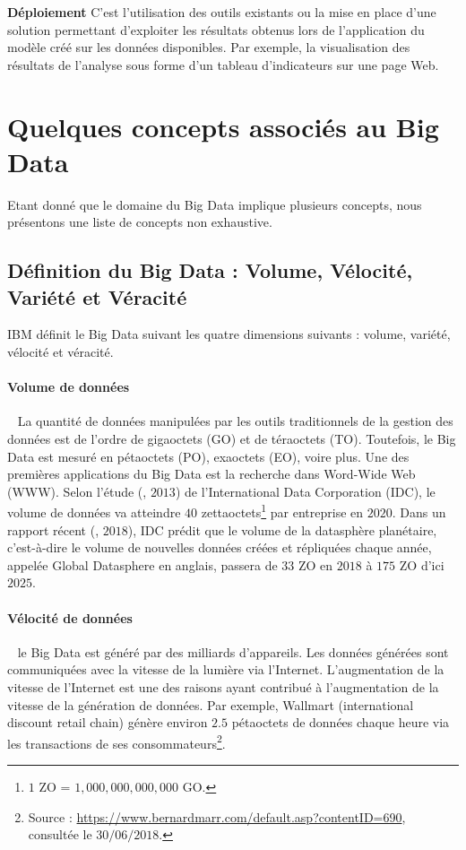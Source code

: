 \textbf{Déploiement}  C'est l'utilisation  des outils existants ou  la mise en place d'une solution permettant d'exploiter les résultats obtenus lors de l'application du modèle créé sur les données disponibles. Par exemple, la  visualisation des résultats de l'analyse  sous forme d'un tableau d'indicateurs sur une page Web. \par
\section{Quelques concepts associés au Big Data}
Etant donné que le domaine du Big Data implique plusieurs concepts, nous présentons une liste de concepts  non exhaustive. 
\subsection{Définition du Big Data : Volume, Vélocité, Variété et Véracité}
		IBM définit le Big Data suivant les quatre dimensions suivants : volume, variété, vélocité et véracité. 
		\paragraph{Volume de données}~
		La quantité de données manipulées par les outils traditionnels de la gestion des données est de l'ordre de gigaoctets (GO) et de téraoctets (TO). Toutefois, le Big Data est mesuré en pétaoctets (PO), exaoctets (EO), voire plus. Une des premières applications du Big Data est la recherche dans Word-Wide Web (WWW). Selon l'étude (\cite{6567202}, $2013$) de l'International Data Corporation (IDC), le volume de données  va atteindre $40$ zettaoctets\footnote{ $ 1$ ZO = $1,000,000,000,000$ GO. } par  entreprise en $2020$. Dans un rapport récent (\cite{IDC-data}, $ 2018 $), 
		IDC prédit que le volume de la  datasphère  planétaire, c'est-à-dire le volume de nouvelles données créées et répliquées chaque année, appelée  Global Datasphere en anglais,  passera de $  33 $ ZO en $2018$ à $175$ ZO d'ici $ 2025 $.
		
		\paragraph{Vélocité de données} ~
		le Big Data est généré par des milliards
		d'appareils. Les données générées sont communiquées avec la vitesse de la lumière via l'Internet. L'augmentation de la vitesse de l'Internet est une  des raisons ayant contribué à l'augmentation de la vitesse de la génération de données.	
		Par exemple, Wallmart (international discount retail chain) génère environ   $2.5$ pétaoctets de données chaque  heure via les transactions de ses consommateurs\footnote{Source : \url{https://www.bernardmarr.com/default.asp?contentID=690}, consultée le $ 30/06/2018 $.}.
